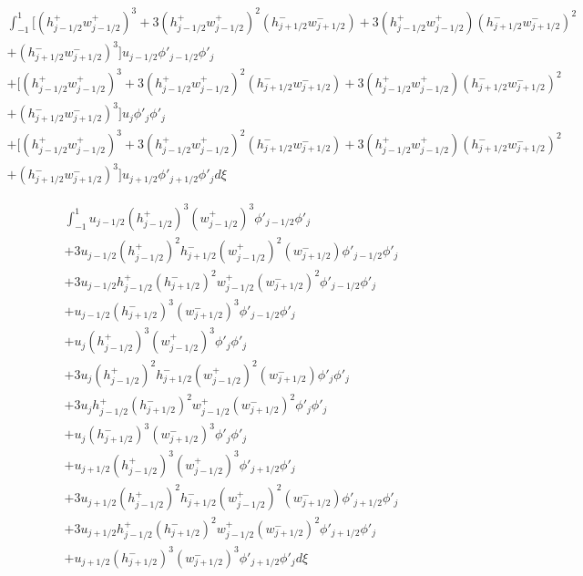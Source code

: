 \documentclass[12pt]{article}
\begin{document}
\begin{multline}
\int_{-1}^{1} \bigg[\left(h^+_{j-1/2} w^+_{j-1/2}\right)^3 + 3\left(h^+_{j-1/2} w^+_{j-1/2}\right)^2\left(h^-_{j+1/2} w^-_{j+1/2}\right) + 3\left(h^+_{j-1/2} w^+_{j-1/2}\right)\left(h^-_{j+1/2} w^-_{j+1/2}\right)^2  \\+  \left(h^-_{j+1/2} w^-_{j+1/2}\right)^3 \bigg]u_{j-1/2}\phi'_{j-1/2}\phi'_{j} \\ +
\bigg[\left(h^+_{j-1/2} w^+_{j-1/2}\right)^3 + 3\left(h^+_{j-1/2} w^+_{j-1/2}\right)^2\left(h^-_{j+1/2} w^-_{j+1/2}\right) + 3\left(h^+_{j-1/2} w^+_{j-1/2}\right)\left(h^-_{j+1/2} w^-_{j+1/2}\right)^2  \\+  \left(h^-_{j+1/2} w^-_{j+1/2}\right)^3 \bigg]u_{j}\phi'_{j}\phi'_{j} \\ +
\bigg[\left(h^+_{j-1/2} w^+_{j-1/2}\right)^3 + 3\left(h^+_{j-1/2} w^+_{j-1/2}\right)^2\left(h^-_{j+1/2} w^-_{j+1/2}\right) + 3\left(h^+_{j-1/2} w^+_{j-1/2}\right)\left(h^-_{j+1/2} w^-_{j+1/2}\right)^2  \\+  \left(h^-_{j+1/2} w^-_{j+1/2}\right)^3 \bigg]u_{j+1/2}\phi'_{j+1/2}\phi'_{j} d\xi
\end{multline}

\begin{multline}
\int_{-1}^{1} u_{j-1/2}\left(h^+_{j-1/2}\right)^3 \left(w^+_{j-1/2}\right)^3 \phi'_{j-1/2}\phi'_{j} \\
+ 3u_{j-1/2}\left(h^+_{j-1/2}\right)^2 h^-_{j+1/2} \left(w^+_{j-1/2}\right)^2\left( w^-_{j+1/2}\right)\phi'_{j-1/2}\phi'_{j} \\
+ 3u_{j-1/2} h^+_{j-1/2}\left(h^-_{j+1/2}\right)^2  w^+_{j-1/2}\left(w^-_{j+1/2}\right)^2\phi'_{j-1/2}\phi'_{j}  \\
+  u_{j-1/2}\left(h^-_{j+1/2}\right)^3 \left(w^-_{j+1/2}\right)^3 \phi'_{j-1/2}\phi'_{j} \\ +
u_{j}\left(h^+_{j-1/2}\right)^3 \left(w^+_{j-1/2}\right)^3 \phi'_{j}\phi'_{j} \\
+ 3u_{j}\left(h^+_{j-1/2}\right)^2 h^-_{j+1/2} \left(w^+_{j-1/2}\right)^2\left( w^-_{j+1/2}\right)\phi'_{j}\phi'_{j} \\
+ 3u_{j} h^+_{j-1/2}\left(h^-_{j+1/2}\right)^2  w^+_{j-1/2}\left(w^-_{j+1/2}\right)^2\phi'_{j}\phi'_{j}  \\
+  u_{j}\left(h^-_{j+1/2}\right)^3 \left(w^-_{j+1/2}\right)^3 \phi'_{j}\phi'_{j} \\ +
u_{j+1/2}\left(h^+_{j-1/2}\right)^3 \left(w^+_{j-1/2}\right)^3 \phi'_{j+1/2}\phi'_{j} \\
+ 3u_{j+1/2}\left(h^+_{j-1/2}\right)^2 h^-_{j+1/2} \left(w^+_{j-1/2}\right)^2\left( w^-_{j+1/2}\right)\phi'_{j+1/2}\phi'_{j} \\
+ 3u_{j+1/2} h^+_{j-1/2}\left(h^-_{j+1/2}\right)^2  w^+_{j-1/2}\left(w^-_{j+1/2}\right)^2\phi'_{j+1/2}\phi'_{j}  \\
+  u_{j+1/2}\left(h^-_{j+1/2}\right)^3 \left(w^-_{j+1/2}\right)^3 \phi'_{j+1/2}\phi'_{j}  d\xi
\end{multline}
\end{document}
